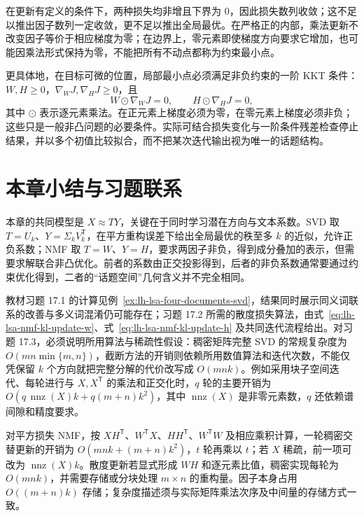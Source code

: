 \begin{notealert}[type=caution,title={损失收敛不等于得到全局最优分解}]
在更新有定义的条件下，两种损失均非增且下界为 $0$，因此损失数列收敛；这不足以推出因子数列一定收敛，更不足以推出全局最优。在严格正的内部，乘法更新不改变因子等价于相应梯度为零；在边界上，零元素即使梯度方向要求它增加，也可能因乘法形式保持为零，不能把所有不动点都称为约束最小点。
\end{notealert}

更具体地，在目标可微的位置，局部最小点必须满足非负约束的一阶 KKT 条件：$W,H\geq0$，$\nabla_WJ,\nabla_HJ\geq0$，且
\begin{equation}
W\odot\nabla_WJ=0,\qquad H\odot\nabla_HJ=0,
\label{eq:lh-lsa-nmf-kkt}
\end{equation}
其中 $\odot$ 表示逐元素乘法。在正元素上梯度必须为零，在零元素上梯度必须非负；这些只是一般非凸问题的必要条件。实际可结合损失变化与一阶条件残差检查停止结果，并以多个初值比较拟合，而不把某次迭代输出视为唯一的话题结构。

\section{本章小结与习题联系}
\label{sec:lh-lsa-summary}

本章的共同模型是 $X\approx TY$，关键在于同时学习潜在方向与文本系数。SVD 取 $T=U_k$、$Y=\Sigma_kV_k^{\mathsf T}$，在平方重构误差下给出全局最优的秩至多 $k$ 的近似，允许正负系数；NMF 取 $T=W$、$Y=H$，要求两因子非负，得到成分叠加的表示，但需要求解联合非凸优化。前者的系数由正交投影得到，后者的非负系数通常要通过约束优化得到，二者的“话题空间”几何含义并不完全相同。

教材习题 17.1 的计算见例~\ref{ex:lh-lsa-four-documents-svd}，结果同时展示同义词联系的改善与多义词混淆仍可能存在；习题 17.2 所需的散度损失算法，由式~\eqref{eq:lh-lsa-nmf-kl-update-w}、式~\eqref{eq:lh-lsa-nmf-kl-update-h} 及共同迭代流程给出。对习题 17.3，必须说明所用算法与稀疏性假设：稠密矩阵完整 SVD 的常规复杂度为 $O(mn\min\{m,n\})$，截断方法的开销则依赖所用数值算法和迭代次数，不能仅凭保留 $k$ 个方向就把完整分解的代价改写成 $O(mnk)$。例如采用块子空间迭代、每轮进行与 $X,X^{\mathsf T}$ 的乘法和正交化时，$q$ 轮的主要开销为 $O(q\,\operatorname{nnz}(X)k+q(m+n)k^2)$，其中 $\operatorname{nnz}(X)$ 是非零元素数，$q$ 还依赖谱间隙和精度要求。

对平方损失 NMF，按 $XH^{\mathsf T}$、$W^{\mathsf T}X$、$HH^{\mathsf T}$、$W^{\mathsf T}W$ 及相应乘积计算，一轮稠密交替更新的开销为 $O(mnk+(m+n)k^2)$，$t$ 轮再乘以 $t$；若 $X$ 稀疏，前一项可改为 $\operatorname{nnz}(X)k$。散度更新若显式形成 $WH$ 和逐元素比值，稠密实现每轮为 $O(mnk)$，并需要存储或分块处理 $m\times n$ 的重构量。因子本身占用 $O((m+n)k)$ 存储；复杂度描述须与实际矩阵乘法次序及中间量的存储方式一致。

